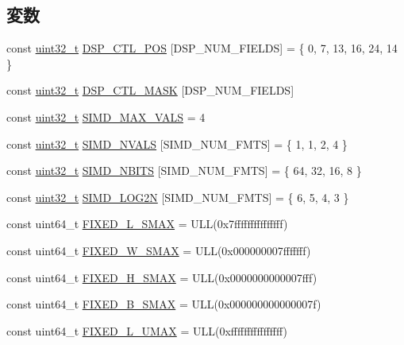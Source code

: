 \subsection*{変数}
\begin{DoxyCompactItemize}
\item 
const \hyperlink{Type_8hh_a435d1572bf3f880d55459d9805097f62}{uint32\_\-t} \hyperlink{namespaceMipsISA_a03ca0e5afd6e4d4ca5cd14a2c0e42122}{DSP\_\-CTL\_\-POS} \mbox{[}DSP\_\-NUM\_\-FIELDS\mbox{]} = \{ 0, 7, 13, 16, 24, 14 \}
\item 
const \hyperlink{Type_8hh_a435d1572bf3f880d55459d9805097f62}{uint32\_\-t} \hyperlink{namespaceMipsISA_a5bb9a799de2f7a0b358e24ef4255787b}{DSP\_\-CTL\_\-MASK} \mbox{[}DSP\_\-NUM\_\-FIELDS\mbox{]}
\item 
const \hyperlink{Type_8hh_a435d1572bf3f880d55459d9805097f62}{uint32\_\-t} \hyperlink{namespaceMipsISA_a3eb40046a295c31f2628bf84a5fde7d1}{SIMD\_\-MAX\_\-VALS} = 4
\item 
const \hyperlink{Type_8hh_a435d1572bf3f880d55459d9805097f62}{uint32\_\-t} \hyperlink{namespaceMipsISA_a82c0828e33920777f7db2e172869fb4f}{SIMD\_\-NVALS} \mbox{[}SIMD\_\-NUM\_\-FMTS\mbox{]} = \{ 1, 1, 2, 4 \}
\item 
const \hyperlink{Type_8hh_a435d1572bf3f880d55459d9805097f62}{uint32\_\-t} \hyperlink{namespaceMipsISA_ac6d349533fc98005c8ccf294db7b8033}{SIMD\_\-NBITS} \mbox{[}SIMD\_\-NUM\_\-FMTS\mbox{]} = \{ 64, 32, 16, 8 \}
\item 
const \hyperlink{Type_8hh_a435d1572bf3f880d55459d9805097f62}{uint32\_\-t} \hyperlink{namespaceMipsISA_a41798bc9afd86d9d94d0f0b3cffca914}{SIMD\_\-LOG2N} \mbox{[}SIMD\_\-NUM\_\-FMTS\mbox{]} = \{ 6, 5, 4, 3 \}
\item 
const uint64\_\-t \hyperlink{namespaceMipsISA_a8598ead33f20be1904a1da8108c40afb}{FIXED\_\-L\_\-SMAX} = ULL(0x7fffffffffffffff)
\item 
const uint64\_\-t \hyperlink{namespaceMipsISA_a86dd8815bd57372a1040ba7cf4d30e28}{FIXED\_\-W\_\-SMAX} = ULL(0x000000007fffffff)
\item 
const uint64\_\-t \hyperlink{namespaceMipsISA_a9a903d88c7f897a8b6fd36c18e83f35d}{FIXED\_\-H\_\-SMAX} = ULL(0x0000000000007fff)
\item 
const uint64\_\-t \hyperlink{namespaceMipsISA_aca960655cd1d092ded4a00e0cfe242f5}{FIXED\_\-B\_\-SMAX} = ULL(0x000000000000007f)
\item 
const uint64\_\-t \hyperlink{namespaceMipsISA_a7009b23763ff7f022676866ad80e2abc}{FIXED\_\-L\_\-UMAX} = ULL(0xffffffffffffffff)

\end{DoxyCompactItemize}
